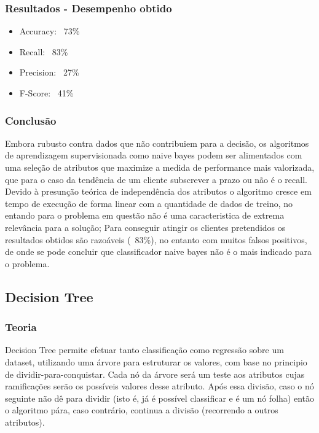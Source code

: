 \documentclass[portugues,final]{revdetua}
\begin{document}
\subsubsection{Resultados - Desempenho obtido}

\begin{itemize}
	\item Accuracy: ~73\%
	\item Recall: ~83\%
	\item Precision: ~27\%
	\item F-Score: ~41\%
\end{itemize}

\subsubsection{Conclusão}
Embora rubusto contra dados que não contribuiem para a decisão, os algoritmos de aprendizagem supervisionada como naive bayes podem ser alimentados com uma seleção de atributos que maximize a medida de performance mais valorizada, que para o caso da tendência de um cliente subscrever a prazo ou não é o recall.\\ 

Devido à presunção teórica de independência dos atributos o algoritmo cresce em tempo de execução de forma linear com a quantidade de dados de treino, no entando para o problema em questão não é uma caracteristica de extrema relevância para a solução; Para conseguir atingir os clientes pretendidos os resultados obtidos são razoáveis (~83\%), no entanto com muitos falsos positivos, de onde se pode concluir que classificador naive bayes não é o mais indicado para o problema.\\

\subsection{Decision Tree}
\subsubsection{Teoria}
Decision Tree permite efetuar tanto classificação como regressão sobre um dataset, utilizando uma árvore para estruturar os valores, com base no principio de dividir-para-conquistar.
Cada nó da árvore será um teste aos atributos cujas ramificações serão os possíveis valores desse atributo. Após essa divisão, caso o nó seguinte não dê para dividir (isto é, já é possível classificar e é um nó folha) então o algoritmo pára, caso contrário, continua a divisão (recorrendo a outros atributos).
\end{document}
